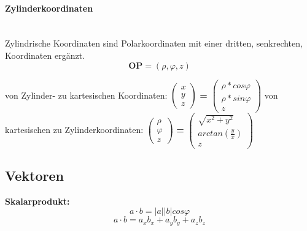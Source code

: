 \documentclass[7pt]{article}
\begin{document}
\begin{multicols*}{3}
\paragraph{Zylinderkoordinaten}

\mbox{}\\ Zylindrische Koordinaten sind Polarkoordinaten mit einer dritten, senkrechten, Koordinaten ergänzt. 
\begin{equation*}
	\textbf{OP} = (\rho, \varphi, z)
\end{equation*}

von Zylinder- zu kartesischen Koordinaten:
\newline 
$\begin{pmatrix} 
	x \\ y \\ z 
\end{pmatrix} $ 
\textbf{=}
$\begin{pmatrix}
	\rho*cos\varphi \\ \rho*sin\varphi \\ z
\end{pmatrix}$
\newline
\newline
\newline von kartesischen zu Zylinderkoordinaten:
\newline $\begin{pmatrix} 
	\rho \\ \varphi \\ z 
\end{pmatrix} $ 
\textbf{=}
$\begin{pmatrix}
	\sqrt{x^{2}+ y^{2}} \\ arctan(\frac{y}{x}) \\ z
\end{pmatrix}$



\subsection{Vektoren}

\mbox{}
\textbf{Skalarprodukt:} 
\begin{equation*}
	a \cdot b = |a||b| cos\varphi
\end{equation*}
\begin{equation*}
	a \cdot b = a_{x} b_{x} + a_{y} b_{y} + a_{z} b_{z}	
\end{equation*}


\end{multicols*}
\end{document}
